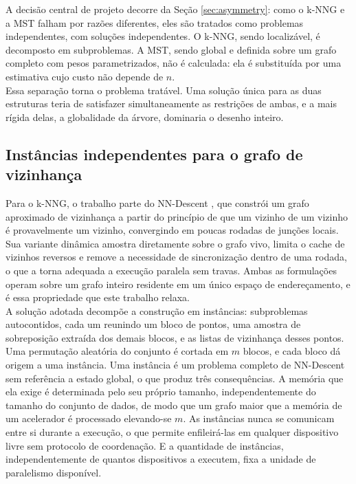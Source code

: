 A decisão central de projeto decorre da Seção \ref{sec:asymmetry}: como o \ac{k-NNG} e a \ac{MST} falham por razões diferentes, eles são tratados como problemas independentes, com soluções independentes. O \ac{k-NNG}, sendo localizável, é decomposto em subproblemas. A \ac{MST}, sendo global e definida sobre um grafo completo com pesos parametrizados, não é calculada: ela é substituída por uma estimativa cujo custo não depende de $n$.\\

Essa separação torna o problema tratável. Uma solução única para as duas estruturas teria de satisfazer simultaneamente as restrições de ambas, e a mais rígida delas, a globalidade da árvore, dominaria o desenho inteiro.\\

\subsection{Instâncias independentes para o grafo de vizinhança\label{sec:adopted-instances}}

Para o \ac{k-NNG}, o trabalho parte do NN-Descent \cite{nndescent}, que constrói um grafo aproximado de vizinhança a partir do princípio de que um vizinho de um vizinho é provavelmente um vizinho, convergindo em poucas rodadas de junções locais. Sua variante dinâmica \cite{dynamic_nndescent} amostra diretamente sobre o grafo vivo, limita o cache de vizinhos reversos e remove a necessidade de sincronização dentro de uma rodada, o que a torna adequada a execução paralela sem travas. Ambas as formulações operam sobre um grafo inteiro residente em um único espaço de endereçamento, e é essa propriedade que este trabalho relaxa.\\

A solução adotada decompõe a construção em instâncias: subproblemas autocontidos, cada um reunindo um bloco de pontos, uma amostra de sobreposição extraída dos demais blocos, e as listas de vizinhança desses pontos. Uma permutação aleatória do conjunto é cortada em $m$ blocos, e cada bloco dá origem a uma instância. Uma instância é um problema completo de NN-Descent sem referência a estado global, o que produz três consequências. A memória que ela exige é determinada pelo seu próprio tamanho, independentemente do tamanho do conjunto de dados, de modo que um grafo maior que a memória de um acelerador é processado elevando-se $m$. As instâncias nunca se comunicam entre si durante a execução, o que permite enfileirá-las em qualquer dispositivo livre sem protocolo de coordenação. E a quantidade de instâncias, independentemente de quantos dispositivos a executem, fixa a unidade de paralelismo disponível.\\

